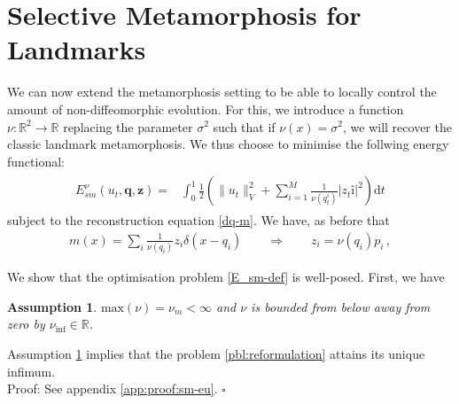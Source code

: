 \documentclass[runningheads]{llncs}
\newcommand{\half}{\frac 12}
\newcommand{\norm}[2]{\| #1 \|_{ #2 }}
\newcommand{\vnorm}[1]{\norm{ #1 }{V}}
\newcommand{\diff}[1]{\text{d} #1}
\newcommand{\nuinf}{\nu_\text{inf}}
\newtheorem{assumption}{Assumption}
\begin{document}
\section{Selective Metamorphosis for Landmarks}\label{sec:select_mm}

We can now extend the metamorphosis setting to be able to locally control the
amount of non-diffeomorphic evolution.  For this, we introduce a function $\nu:
\mathbb R^2\to \mathbb R$ replacing the parameter $\sigma^2$ such that if
$\nu(x)=\sigma^2$, we will recover the classic landmark metamorphosis.
We thus choose to minimise the follwing energy functional:
\begin{align}
  \begin{split}
    E_{sm}^\nu(u_t, \mathbf q, \mathbf z) = & \int_0^1
    \half  \left (\vnorm{u_t}^2 +\sum_{i=1}^M \frac{1}{\nu(q_t^i)}|z_tî|^2\right )\diff{t}
  \end{split}
  \label{E_sm-def}
\end{align}
subject to the reconstruction equation \eqref{dq-m}. We have, as before that
\begin{align}\label{zp_relation}
  m(x) =  \sum_i \frac{1}{\nu(q_i)} z_i\delta(x-q_i)\qquad \Rightarrow \qquad
  z_i = \nu(q_i) p_i\, , 
\end{align}

We show that the optimisation problem \eqref{E_sm-def} is well-posed. First, we
have
\begin{assumption}\label{assumption:nu_bounded}
$\mathrm{max}(\nu) = \nu_m < \infty$ and $\nu$ is bounded from below
away from zero by $\nuinf \in \mathbb R$.
\end{assumption}

\begin{theorem}\label{sm-eu}
Assumption \ref{assumption:nu_bounded} implies that the problem
\eqref{pbl:reformulation} attains its unique infimum.\\

Proof: See appendix \ref{app:proof:sm-eu}.
{\hfill $\square$}
\end{theorem}
\end{document}
